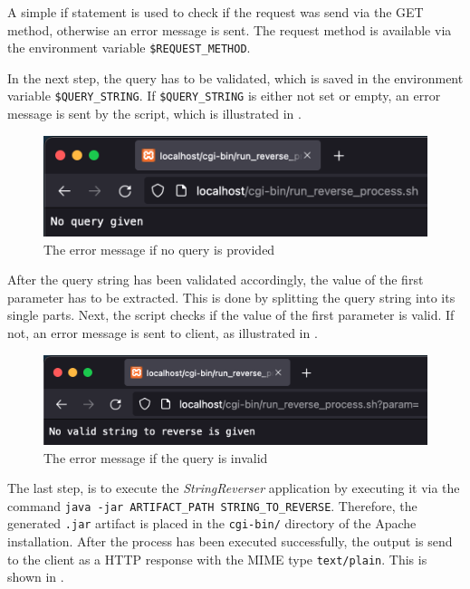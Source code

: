 A simple if statement is used to check if the request was send via the GET method, otherwise an error message is sent. The request method is available via the environment variable \texttt{\$REQUEST\_METHOD}.


In the next step, the query has to be validated, which is saved in the environment variable \texttt{\$QUERY\_STRING}. If \texttt{\$QUERY\_STRING} is either not set or empty, an error message is sent by the script, which is illustrated in .

\begin{figure}[h]
\centering
\includegraphics[scale=0.6]{images/part2Failure1}
\caption{The error message if no query is provided}
\label{fig:02_part2_impl_failure1}
\end{figure}

After the query string has been validated accordingly, the value of the first parameter has to be extracted. This is done by splitting the query string into its single parts. Next, the script checks if the value of the first parameter is valid. If not, an error message is sent to client, as illustrated in .

\begin{figure}[h]
\centering
\includegraphics[scale=0.6]{images/part2Failure2}
\caption{The error message if the query is invalid}
\label{fig:02_part2_impl_failure2}
\end{figure}

The last step, is to execute the \textit{StringReverser} application by executing it via the command \texttt{java -jar ARTIFACT\_PATH STRING\_TO\_REVERSE}. Therefore, the generated \texttt{.jar} artifact is placed in the \texttt{cgi-bin/} directory of the Apache installation. After the process has been executed successfully, the output is send to the client as a HTTP response with the MIME type \texttt{text/plain}. This is shown in .

